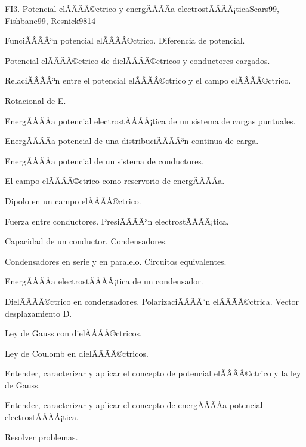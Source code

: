 \begin{sumilla}
\begin{unit}{FI3. Potencial elÃÂÃÂ©ctrico y energÃÂÃÂ­a electrostÃÂÃÂ¡tica}{Sears99, Fishbane99, Resnick98}{14}
   \begin{topicos}
         \item  FunciÃÂÃÂ³n potencial elÃÂÃÂ©ctrico. Diferencia de potencial.
	 \item  Potencial elÃÂÃÂ©ctrico de dielÃÂÃÂ©ctricos y conductores cargados.
         \item  RelaciÃÂÃÂ³n entre el potencial elÃÂÃÂ©ctrico y el campo elÃÂÃÂ©ctrico.
	 \item  Rotacional de E.
         \item  EnergÃÂÃÂ­a potencial electrostÃÂÃÂ¡tica de un sistema de cargas puntuales.
	 \item  EnergÃÂÃÂ­a potencial de una distribuciÃÂÃÂ³n continua de carga.
         \item  EnergÃÂÃÂ­a potencial de un sistema de conductores.
	 \item  El campo elÃÂÃÂ©ctrico como reservorio de energÃÂÃÂ­a.
         \item  Dipolo en un campo elÃÂÃÂ©ctrico.
         \item  Fuerza entre conductores.  PresiÃÂÃÂ³n electrostÃÂÃÂ¡tica.
         \item  Capacidad de un conductor. Condensadores.
         \item  Condensadores en serie y en paralelo.  Circuitos equivalentes.
         \item  EnergÃÂÃÂ­a electrostÃÂÃÂ¡tica de un condensador.
         \item  DielÃÂÃÂ©ctrico en condensadores.  PolarizaciÃÂÃÂ³n elÃÂÃÂ©ctrica.  Vector desplazamiento D.
         \item  Ley de Gauss con dielÃÂÃÂ©ctricos.
         \item  Ley de Coulomb en dielÃÂÃÂ©ctricos.
   \end{topicos}

   \begin{objetivos}
         \item  Entender, caracterizar y aplicar el concepto de potencial elÃÂÃÂ©ctrico y la ley de Gauss.
         \item  Entender, caracterizar y aplicar el concepto de energÃÂÃÂ­a potencial electrostÃÂÃÂ¡tica.
         \item  Resolver problemas.
   \end{objetivos}
\end{unit}


\end{sumilla}
